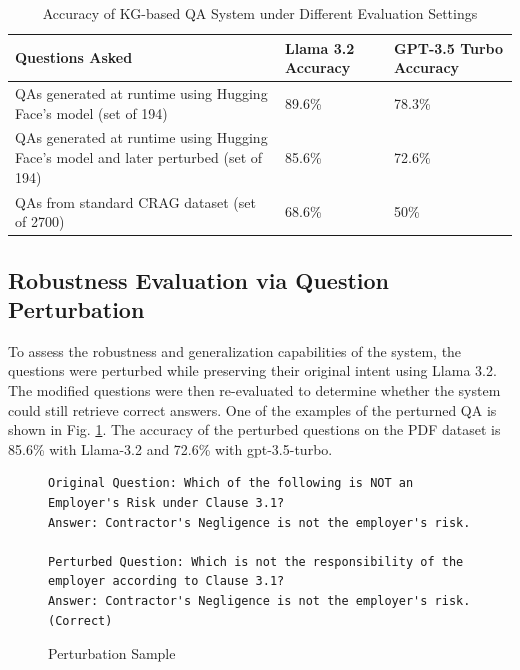 \begin{table}[!htbp]
\centering
\caption{Accuracy of KG-based QA System under Different Evaluation Settings}
\label{table:accuracy_results}
\renewcommand{\arraystretch}{1.5}
\begin{tabular}{| p{9cm} | p{1.5cm} | p{1.5cm} |}
\hline
\textbf{Questions Asked} & \textbf{Llama 3.2 Accuracy} & \textbf{GPT-3.5 Turbo Accuracy} \\
\hline
QAs generated at runtime using Hugging Face's model (set of 194) & 89.6\% & 78.3\% \\
QAs generated at runtime using Hugging Face's model and later perturbed (set of 194) & 85.6\% & 72.6\% \\
QAs from standard CRAG dataset (set of 2700) & 68.6\% & 50\% \\
\hline
\end{tabular}
\end{table}


\subsection{Robustness Evaluation via Question Perturbation}
To assess the robustness and generalization capabilities of the system, the questions were perturbed while preserving their original intent using Llama 3.2. The modified questions were then re-evaluated to determine whether the system could still retrieve correct answers. One of the examples of the perturned QA is shown in Fig. \ref{lst:perturb_sample}. The accuracy of the perturbed questions on the PDF dataset is 85.6\% with Llama-3.2 and 72.6\% with gpt-3.5-turbo.

\begin{figure}
\centering
\begin{lstlisting}
Original Question: Which of the following is NOT an Employer's Risk under Clause 3.1?
Answer: Contractor's Negligence is not the employer's risk.

Perturbed Question: Which is not the responsibility of the employer according to Clause 3.1?
Answer: Contractor's Negligence is not the employer's risk. (Correct)
\end{lstlisting}
\caption{Perturbation Sample}
\label{lst:perturb_sample}
\end{figure}

